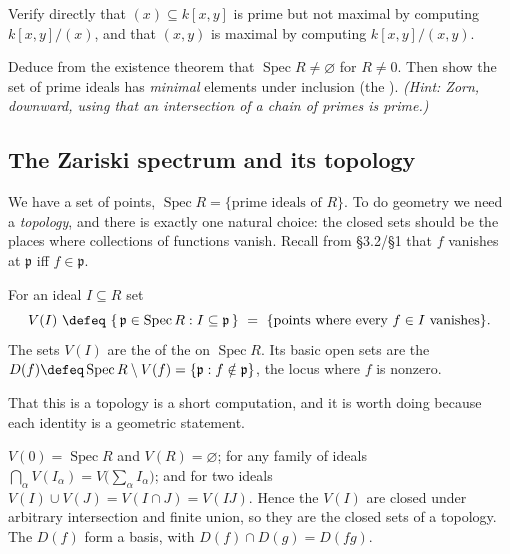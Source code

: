\documentclass[11pt]{article}
\DeclareMathOperator{\Spec}{Spec}
\newcommand{\mfp}{\mathfrak{p}}
\begin{document}
\begin{xca}
Verify directly that $(x)\subseteq k[x,y]$ is prime but not maximal by computing
$k[x,y]/(x)$, and that $(x,y)$ is maximal by computing $k[x,y]/(x,y)$.
\end{xca}

\begin{xca}
Deduce from the existence theorem that $\Spec R\neq\varnothing$ for $R\neq 0$. Then show the
set of prime ideals has \emph{minimal} elements under inclusion (the ).
\emph{(Hint: Zorn, downward, using that an intersection of a chain of primes is prime.)}
\end{xca}

\subsection{The Zariski spectrum and its topology}

We have a set of points, $\Spec R=\{\text{prime ideals of }R\}$. To do geometry we need a
\emph{topology}, and there is exactly one natural choice: the closed sets should be the places
where collections of functions vanish. Recall from \S3.2/\S1 that $f$ vanishes at $\mfp$ iff
$f\in\mfp$.

\begin{ddefinition}
For an ideal $I\subseteq R$ set
\[
V(I)\ \defeq\ \{\,\mfp\in\Spec R: I\subseteq\mfp\,\}\ =\ \{\text{points where every } f\in I \text{ vanishes}\}.
\]
The sets $V(I)$ are the  of the  on $\Spec R$. Its
basic open sets are the 
$D(f)\defeq \Spec R\setminus V(f)=\{\mfp: f\notin\mfp\}$, the locus where $f$ is nonzero.
\end{ddefinition}

That this is a topology is a short computation, and it is worth doing because each identity is
a geometric statement.

\begin{pproposition}
$V(0)=\Spec R$ and $V(R)=\varnothing$; for any family of ideals
$\bigcap_\alpha V(I_\alpha)=V\big(\sum_\alpha I_\alpha\big)$; and for two ideals
$V(I)\cup V(J)=V(I\cap J)=V(IJ)$. Hence the $V(I)$ are closed under arbitrary intersection and
finite union, so they are the closed sets of a topology. The $D(f)$ form a basis, with
$D(f)\cap D(g)=D(fg)$.
\end{pproposition}
\end{document}
